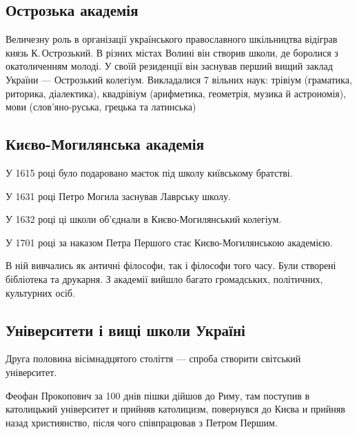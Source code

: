 \documentclass[a5paper,10pt,titlepage,pdftex,headsepline]{scrartcl}
\begin{document}
\subsection{Острозька академія}
Величезну роль в організації українського православного шкільництва відіграв князь К.\,Острозький.
В різних містах Волині він створив школи, де боролися з окатоличенням молоді.
У своїй резиденції він заснував перший вищий заклад України --- Острозький колегіум.
Викладалися 7 вільних наук: трівіум (граматика, риторика, діалектика), квадрівіум (арифметика, геометрія, музика й астрономія), мови (слов’яно-руська, грецька та латинська)
\subsection{Києво-Могилянська академія}
У 1615 році було подаровано маєток під школу київському братстві.

У 1631 році Петро Могила заснував Лаврську школу.

У 1632 році ці школи об’єднали в Києво-Могилянський колегіум.

У 1701 році за наказом Петра Першого стає Києво-Могилянською академією.

В ній вивчались як античні філософи, так і філософи того часу.
Були створені бібліотека та друкарня.
З академії вийшло багато громадських, політичних, культурних осіб.
\subsection{Університети і вищі школи Україні}
Друга половина вісімнадцятого століття --- спроба створити світський університет.

Феофан Прокопович за 100 днів пішки дійшов до Риму, там поступив в католицький університет и прийняв католицизм, повернувся до Києва и прийняв назад християнство, після чого співпрацював з Петром Першим.
\end{document}
